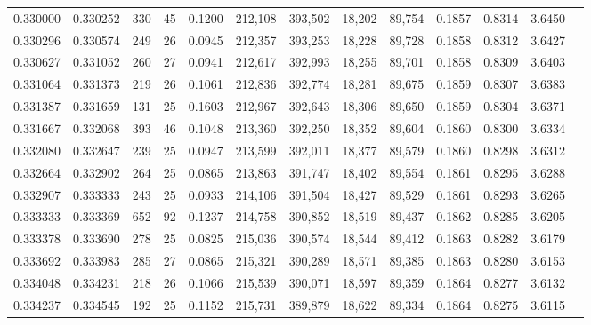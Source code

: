 \begin{tabular}{rrrrrrrrrrrrr}
0.330000 & 0.330252 &    330 &    45 &                                     0.1200 & 212,108 & 393,502 &  18,202 &  89,754 & 0.1857 & 0.8314 & 3.6450 \\
0.330296 & 0.330574 &    249 &    26 &                                     0.0945 & 212,357 & 393,253 &  18,228 &  89,728 & 0.1858 & 0.8312 & 3.6427 \\
0.330627 & 0.331052 &    260 &    27 &                                     0.0941 & 212,617 & 392,993 &  18,255 &  89,701 & 0.1858 & 0.8309 & 3.6403 \\
0.331064 & 0.331373 &    219 &    26 &                                     0.1061 & 212,836 & 392,774 &  18,281 &  89,675 & 0.1859 & 0.8307 & 3.6383 \\
0.331387 & 0.331659 &    131 &    25 &                                     0.1603 & 212,967 & 392,643 &  18,306 &  89,650 & 0.1859 & 0.8304 & 3.6371 \\
0.331667 & 0.332068 &    393 &    46 &                                     0.1048 & 213,360 & 392,250 &  18,352 &  89,604 & 0.1860 & 0.8300 & 3.6334 \\
0.332080 & 0.332647 &    239 &    25 &                                     0.0947 & 213,599 & 392,011 &  18,377 &  89,579 & 0.1860 & 0.8298 & 3.6312 \\
0.332664 & 0.332902 &    264 &    25 &                                     0.0865 & 213,863 & 391,747 &  18,402 &  89,554 & 0.1861 & 0.8295 & 3.6288 \\
0.332907 & 0.333333 &    243 &    25 &                                     0.0933 & 214,106 & 391,504 &  18,427 &  89,529 & 0.1861 & 0.8293 & 3.6265 \\
0.333333 & 0.333369 &    652 &    92 &                                     0.1237 & 214,758 & 390,852 &  18,519 &  89,437 & 0.1862 & 0.8285 & 3.6205 \\
0.333378 & 0.333690 &    278 &    25 &                                     0.0825 & 215,036 & 390,574 &  18,544 &  89,412 & 0.1863 & 0.8282 & 3.6179 \\
0.333692 & 0.333983 &    285 &    27 &                                     0.0865 & 215,321 & 390,289 &  18,571 &  89,385 & 0.1863 & 0.8280 & 3.6153 \\
0.334048 & 0.334231 &    218 &    26 &                                     0.1066 & 215,539 & 390,071 &  18,597 &  89,359 & 0.1864 & 0.8277 & 3.6132 \\
0.334237 & 0.334545 &    192 &    25 &                                     0.1152 & 215,731 & 389,879 &  18,622 &  89,334 & 0.1864 & 0.8275 & 3.6115 \\

\end{tabular}
